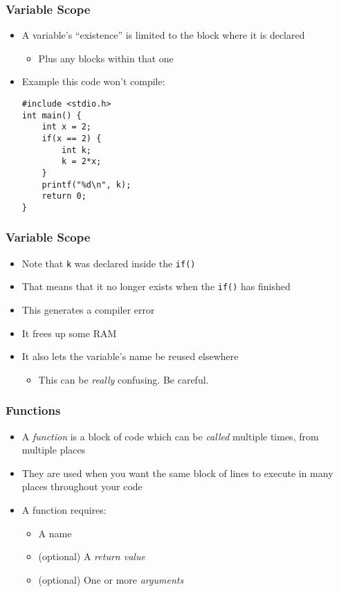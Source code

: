 \documentclass[14pt]{beamer}
\begin{document}
\begin{frame}[fragile]
\frametitle{Variable Scope}
\begin{itemize}
\item A variable's ``existence'' is limited to the block where it is declared
	\begin{itemize}
		\item Plus any blocks within that one
	\end{itemize}
\item Example this code won't compile:
\begin{lstlisting}[style=CStyle]
#include <stdio.h>
int main() {
	int x = 2;
	if(x == 2) {
		int k;
		k = 2*x;
	}
	printf("%d\n", k);
	return 0;
}
\end{lstlisting}
\end{itemize}
\end{frame}

\begin{frame}
\frametitle{Variable Scope}
\begin{itemize}
\item Note that \texttt{k} was declared inside the \texttt{if()}
\item That means that it no longer exists when the \texttt{if()} has finished
\item This generates a compiler error
\item It frees up some RAM
\item It also lets the variable's name be reused elsewhere
	\begin{itemize}
		\item This can be \textit{really} confusing. Be careful.
	\end{itemize}
\end{itemize}
\end{frame}

\begin{frame}
\frametitle{Functions}
\begin{itemize}
\item A \textit{function} is a block of code which can be \textit{called} multiple times, from multiple places
\item They are used when you want the same block of lines to execute in many places throughout your code
\item A function requires:
	\begin{itemize}
		\item A name
		\item (optional) A \textit{return value}
		\item (optional) One or more \textit{arguments}
	\end{itemize}
\end{itemize}
\end{frame}
\end{document}
